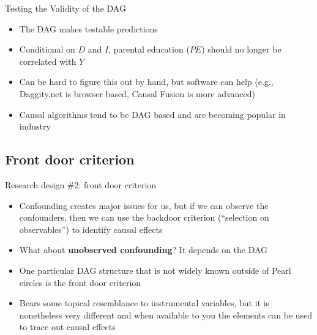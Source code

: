 \documentclass{beamer}
\begin{document}
\begin{frame}{Testing the Validity of the DAG}

  \begin{itemize}
    \item The DAG makes testable predictions
    \item Conditional on $D$ and $I$, parental education ($PE$) should no longer be correlated with $Y$
    \item Can be hard to figure this out by hand, but software can help (e.g., Daggity.net is browser based, Causal Fusion is more advanced)
    \item Causal algorithms tend to be DAG based and are becoming popular in industry
  \end{itemize}

  \begin{center}
  \end{center}

\end{frame}

\subsection{Front door criterion}

\begin{frame}{Research design \#2: front door criterion}

  \begin{itemize}
    \item Confounding creates major issues for us, but if we can observe the confounders, then we can use the backdoor criterion (``selection on observables'') to identify causal effects
    \item What about \textbf{unobserved confounding}?  It depends on the DAG
    \item One particular DAG structure that is not widely known outside of Pearl circles is the front door criterion
    \item Bears some topical resemblance to instrumental variables, but it is nonetheless very different and when available to you the elements can be used to trace out causal effects
  \end{itemize}

\end{frame}
\end{document}
